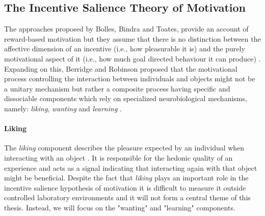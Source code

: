 \subsection{The Incentive Salience Theory of Motivation}
\label{incentive_salience}
The approaches proposed by Bolles, Bindra and Toates,  provide an account of reward-based motivation but they assume that there is no distinction between the affective dimension of an incentive (i.e., how pleasurable it is) and the purely motivational aspect of it (i.e., how much goal directed behaviour it can produce) \cite{bindra1978adaptive,toates1994comparing}. Expanding on this, Berridge and Robinson proposed that the motivational process controlling the interaction between individuals and objects might not be a unitary mechanism but rather a composite process having specific and dissociable components which rely on specialized neurobiological mechanisms, namely: \emph{liking}, \emph{wanting} and \emph{learning} \cite{berridge1998role,berridge2009dissecting,smith2011disentangling}.

\paragraph*{Liking}
\label{liking}
The \emph{liking} component describes the pleasure expected by an individual when interacting with an object \cite{berridge2009dissecting}. It is responsible for the hedonic quality of an experience and acts as a signal indicating that interacting again with that object might be beneficial. Despite the fact that \emph{liking} plays an important role in the incentive salience hypothesis of motivation it is difficult to measure it outside controlled laboratory environments \cite{berridge1998role} and it will not form a central theme of this thesis. Instead, we will focus on the "wanting" and "learning" components.

